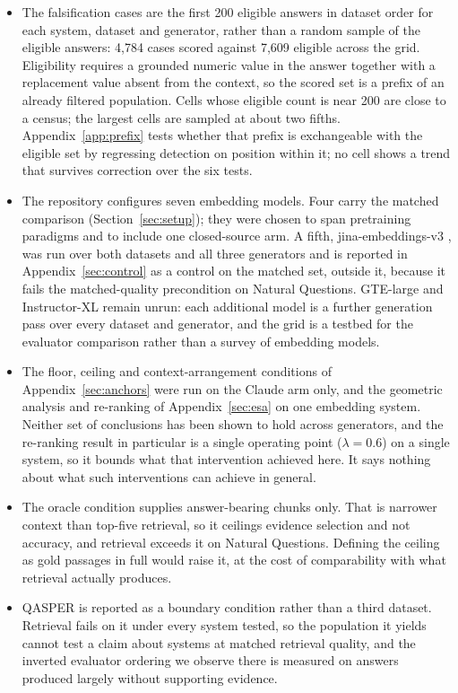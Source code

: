 \documentclass[11pt]{article}
\begin{document}
\begin{itemize}
\item The falsification cases are the first 200 eligible answers in dataset order for each system, dataset and generator, rather than a random sample of the eligible answers: 4,784 cases scored against 7,609 eligible across the grid. Eligibility requires a grounded numeric value in the answer together with a replacement value absent from the context, so the scored set is a prefix of an already filtered population. Cells whose eligible count is near 200 are close to a census; the largest cells are sampled at about two fifths. Appendix~\ref{app:prefix} tests whether that prefix is exchangeable with the eligible set by regressing detection on position within it; no cell shows a trend that survives correction over the six tests.
\item The repository configures seven embedding models. Four carry the matched comparison (Section~\ref{sec:setup}); they were chosen to span pretraining paradigms and to include one closed-source arm. A fifth, jina-embeddings-v3 \citep{sturua-etal-2024}, was run over both datasets and all three generators and is reported in Appendix~\ref{sec:control} as a control on the matched set, outside it, because it fails the matched-quality precondition on Natural Questions. GTE-large and Instructor-XL remain unrun: each additional model is a further generation pass over every dataset and generator, and the grid is a testbed for the evaluator comparison rather than a survey of embedding models.

\item The floor, ceiling and context-arrangement conditions of Appendix~\ref{sec:anchors} were run on the Claude arm only, and the geometric analysis and re-ranking of Appendix~\ref{sec:esa} on one embedding system. Neither set of conclusions has been shown to hold across generators, and the re-ranking result in particular is a single operating point ($\lambda = 0.6$) on a single system, so it bounds what that intervention achieved here. It says nothing about what such interventions can achieve in general.

\item The oracle condition supplies answer-bearing chunks only. That is narrower context than top-five retrieval, so it ceilings evidence selection and not accuracy, and retrieval exceeds it on Natural Questions. Defining the ceiling as gold passages in full would raise it, at the cost of comparability with what retrieval actually produces.

\item QASPER is reported as a boundary condition rather than a third dataset. Retrieval fails on it under every system tested, so the population it yields cannot test a claim about systems at matched retrieval quality, and the inverted evaluator ordering we observe there is measured on answers produced largely without supporting evidence.


\end{itemize}
\end{document}
